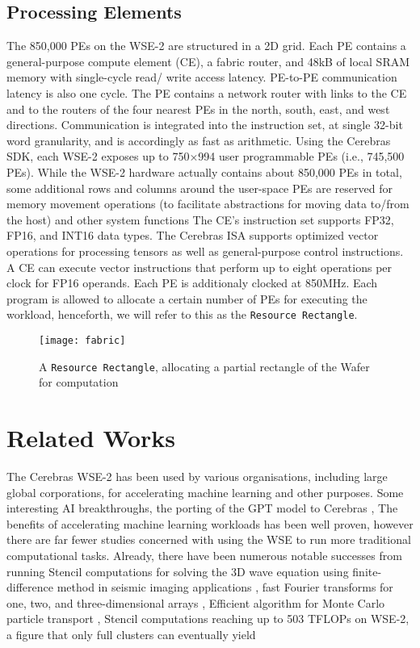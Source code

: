 \subsection{Processing Elements}

The 850,000 PEs on the WSE-2 are structured in a 2D grid. Each PE contains a general-purpose compute element (CE), a fabric router, and 48kB of local SRAM memory with single-cycle read/
write access latency. PE-to-PE communication latency is also one cycle. The PE contains a network
router with links to the CE and to the routers of the four nearest PEs in the north, south, east,
and west directions. Communication is integrated into the instruction set, at single 32-bit word
granularity, and is accordingly as fast as arithmetic.
Using the Cerebras SDK, each WSE-2 exposes up to 750×994 user programmable
PEs (i.e., 745,500 PEs). While the WSE-2 hardware actually contains about 850,000
PEs in total, some additional rows and columns around the user-space PEs are reserved for memory movement operations (to facilitate abstractions for moving data
to/from the host) and other system functions
The CE's instruction set supports FP32, FP16, and INT16 data types. The Cerebras ISA supports
optimized vector operations for processing tensors as well as general-purpose control instructions.
A CE can execute vector instructions that perform up to eight operations per clock for FP16
operands.
Each PE is additionaly clocked at 850MHz. Each program is allowed to allocate a certain number of PEs for executing the workload, henceforth, we will refer to this as the \texttt{Resource Rectangle}.

\begin{figure}[h!]
    \texttt{[image: fabric]}
    \centering
    \caption{A \texttt{Resource Rectangle}, allocating a partial rectangle of the Wafer for computation}
\end{figure}

\section{Related Works}

The Cerebras WSE-2 has been used by various organisations, including large global corporations, for accelerating machine learning and other purposes. Some interesting AI breakthroughs, the porting of the GPT model to Cerebras \cite{3}, The benefits of accelerating machine learning workloads has been well proven, however there are far fewer studies concerned with using the WSE to run more traditional computational tasks. Already, there have been numerous notable successes from running Stencil computations for solving the 3D wave equation using finite-difference method in seismic imaging applications \cite{5}, fast Fourier transforms for one, two, and three-dimensional arrays \cite{6}, Efficient algorithm for Monte Carlo particle transport \cite{7}, Stencil computations reaching up to 503 TFLOPs on WSE-2, a figure that only full clusters can eventually yield \cite{8}

